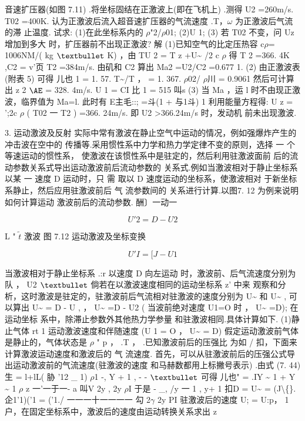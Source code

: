 音速扩压器(如图 7.11) .将坐标固结在正激波上(即在飞机上) .测得 U2 =260m/s. T02 =400K. 认为正激波后流入超音速扩压器的气流速度 .T，$\omega$ 为正激波后气流的滞 止温度. 试求: (1)在此坐标系内的 $\rho$"2/$\rho$01; (2)U 1; (3) 若 T02 不变，问 Uz 增加到多大 时，扩压器前不出现正激波? 解 (1)已知空气的比定压热容 c$\rho$= 1006NM/( kg ${\rm •}$ K) ，由 TU 2 = T z +U\textasciitilde{} /2 c $\rho$ 得 T 2 =366. 4K ,C2 = v'页 T2 =384m/s. 由矶和 C2 算出 Ma2 =U2/C2 =0.677 1. (2) 由正激波表(附表 5) 可得 儿也 1 = 1. 57. T\textasciitilde{}/T ， = 1. 367. $\rho$02/ $\rho$川 = 0.9061 然后可计算出 z 2 ${\rm Æ}$ = 328. 4m/s. U 1 = CI 比 1 = 515 叫s (3) 当 Ma ，运 l 时不由现正激波，临界值为 Ma=l. 此时有 E主毛::; =斗(1 + 与1斗) 1 利用能量方程得: U z = ';2c $\rho$ ( T02 一 T2 ) =366. 24m/s. 即 U2 >366.24m/s 时，发动机 前未出现激波.

3. 运动激波及反射 实际中常有激波在静止空气中运动的情况，例如强爆炸产生的冲击波在空中的 传播等.采用惯性系中力学和热力学定律不变的原则，选择 一 个等速运动的惯性系， 使激波在该惯性系中是驻定的，然后利用驻激波面前 后的流动参数关系式导出运动激波前后流动参数的 关系式.例如当激波相对于静止坐标系以某 一 速度 D 运动时，只 需 取以 D 速度运动的坐标系，使激波相对 于新坐标系静止，然后应用驻激波前后 气 流参数间的 关系进行计算.以图7. 12 为例来说明如何计算运动 激波前后的流动参数. 酬〕一动一

\[U'2=D-U2\]

L " $\tilde{t}$ 激波 图 7.12 运动激波及坐标变换

\[U'I =[J-U1\]

当激波相对于静止坐标系 .:r 以速度 D 向左运动 时，激波前、后气流速度分别为队 ， U2 ${\rm •}$ 倘若在以激波速度相同的运动坐标系 z' 中来 观察和分析，这时激波是驻定的，驻激波前后气流相对驻激波的速度分别为 U\textasciitilde{} 和 U\textasciitilde{} , 可以算出 U\textasciitilde{} = D - U , ， U\textasciitilde{} =D - U2 ( 当波前绝对速度 U1=O 时 ， U\textasciitilde{} =D); 在运动坐标 系中，除滞止参数外其他热力学参量 和驻激波相同.具体计算如下. (1)静止气体 rt 1 运动激波速度和伴随速度 (U 1 = O ， U\textasciitilde{} = D) 假定运动激波前气体是静止的，气体状态是 $\rho$ " p ， .T ， .已知激波前后的压强比 为如 / 扣，下面来计算激波运动速度和激波后的 气 流速度. 首先，可以从驻激波前后的压强公式导出运动激波前的气流速度(驻激波的速度 和马赫数都用上标撇号表示) .由式 (7. 44) 生 = l+lL( 胁 '12 \_ 1) $\rho$1 -, Y + 1 , - - ${\rm •}$ 可得 儿也" = .IY \textasciitilde{} 1 + Y \textasciitilde{} 1 $\rho$ z 一'一于一- a 叫V 2y , 2y $\rho$I 于是 - \_, /y 一 1 , y+ 1 扣D = U\textasciitilde{} = (J\textbackslash\{\}.企1'1)('1 = ('1./ 一一一十一一一一 勾 2$\gamma$ 2y PI 驻激波后的速度 U; = U:p， 1户，在固定坐标系中，激波后的速度由运动转换关系求出 z

